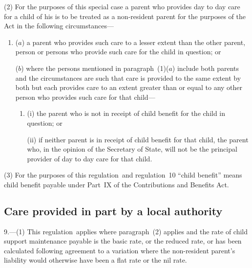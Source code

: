 \documentclass[12pt,a4paper]{article}
\begin{document}
(2) For the purposes of this special case a parent who provides day to day care for a child of his is to be treated as a non-resident parent for the purposes of the Act in the following circumstances—
\begin{enumerate}\item[]
($a$) a parent who provides such care to a lesser extent than the other parent, person or persons who provide such care for the child in question; or

($b$) where the persons mentioned in paragraph~(1)($a$)  include both parents and the circumstances are such that care is provided to the same extent by both but each provides care to an extent greater than or equal to any other person who provides such care for that child—
\begin{enumerate}\item[]
(i) the parent who is not in receipt of child benefit for the child in question; or

(ii) if neither parent is in receipt of child benefit for that child, the parent who, in the opinion of the Secretary of State, will not be the principal provider of day to day care for that child.
\end{enumerate}
\end{enumerate}

(3) For the purposes of this regulation~and regulation~10 “child benefit” means child benefit payable under Part~IX of the Contributions and Benefits Act.


\subsection[9. Care provided in part by a local authority]{Care provided in part by a local authority}

9.---(1)  This regulation~applies where paragraph~(2) applies and the rate of child support maintenance payable is the basic rate, or the reduced rate, or has been calculated following agreement to a variation where the non-resident parent’s liability would otherwise have been a flat rate or the nil rate.
\end{document}
